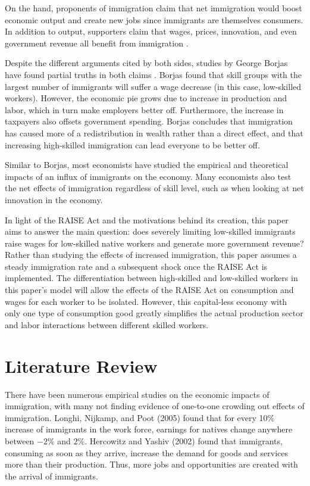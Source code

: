 \documentclass[11pt]{article}
\begin{document}
On the hand, proponents of immigration claim that net immigration would boost economic output and create new jobs since immigrants are themselves consumers. In addition to output, supporters claim that wages, prices, innovation, and even government revenue all benefit from immigration \cite{fortune}.

Despite the different arguments cited by both sides, studies by George Borjas have found partial truths in both claims \cite{politico}. Borjas found that skill groups with the largest number of immigrants will suffer a wage decrease (in this case, low-skilled workers). However, the economic pie grows due to increase in production and labor, which in turn make employers better off. Furthermore, the increase in taxpayers also offsets government spending. Borjas concludes that immigration has caused more of a redistribution in wealth rather than a direct effect, and that increasing high-skilled immigration can lead everyone to be better off.

Similar to Borjas, most economists have studied the empirical and theoretical impacts of an influx of immigrants on the economy. Many economists also test the net effects of immigration regardless of skill level, such as when looking at net innovation in the economy.

In light of the RAISE Act and the motivations behind its creation, this paper aims to answer the main question: does severely limiting low-skilled immigrants raise wages for low-skilled native workers and generate more government revenue? Rather than studying the effects of increased immigration, this paper assumes a steady immigration rate and a subsequent shock once the RAISE Act is implemented. The differentiation between high-skilled and low-skilled workers in this paper's model will allow the effects of the RAISE Act on consumption and wages for each worker to be isolated. However, this capital-less economy with only one type of consumption good greatly simplifies the actual production sector and labor interactions between different skilled workers.

\section{Literature Review}

There have been numerous empirical studies on the economic impacts of immigration, with many not finding evidence of one-to-one crowding out effects of immigration. Longhi, Nijkamp, and Poot (2005) \cite{longhi} found that for every 10$\%$ increase of immigrants in the work force, earnings for natives change anywhere between $-2\%$ and $2\%$. Hercowitz and Yashiv (2002) \cite{hercowitz} found that immigrants, consuming as soon as they arrive, increase the demand for goods and services more than their production. Thus, more jobs and opportunities are created with the arrival of immigrants.
\end{document}
